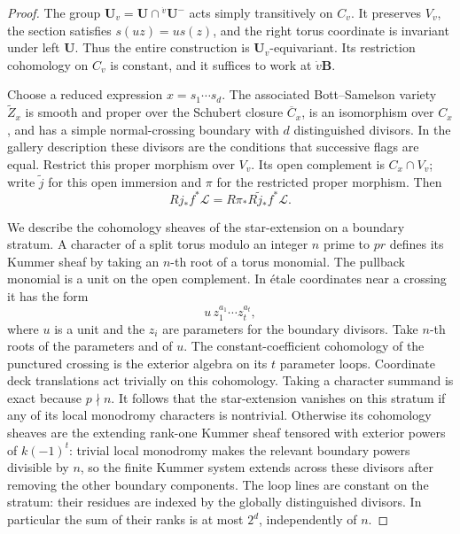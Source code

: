 \begin{proof}
The group \(\mathbf U_v=\mathbf U\cap{}^{\dot v}\mathbf U^-\) acts
simply transitively on \(C_v\). It preserves \(V_v\), the section
satisfies \(s(uz)=us(z)\), and the right torus coordinate is invariant
under left \(\mathbf U\). Thus the entire construction is
\(\mathbf U_v\)-equivariant. Its restriction cohomology on \(C_v\) is
constant, and it suffices to work at \(\dot v\mathbf B\).

Choose a reduced expression \(x=s_1\cdots s_d\). The associated
Bott--Samelson variety \(\widetilde Z_x\) is smooth and proper over
the Schubert closure \(\overline C_x\), is an isomorphism over \(C_x\),
and has a simple normal-crossing boundary with \(d\) distinguished
divisors. In the gallery description these divisors are the conditions
that successive flags are equal. Restrict this proper morphism over
\(V_v\). Its open complement is \(C_x\cap V_v\); write \(\widetilde j\)
for this open immersion and \(\pi\) for the restricted proper morphism.
Then
\[
 Rj_*f^*\mathcal L=R\pi_*R\widetilde j_*f^*\mathcal L.
\]

We describe the cohomology sheaves of the star-extension on a boundary
stratum. A character of a split torus modulo an integer \(n\) prime
to \(pr\) defines its Kummer sheaf by taking an \(n\)-th root of a
torus monomial. The pullback monomial is a unit on the open complement.
In \'etale coordinates near a crossing it has the form
\[
 u\,z_1^{a_1}\cdots z_t^{a_t},
\]
where \(u\) is a unit and the \(z_i\) are parameters for the boundary
divisors. Take \(n\)-th roots of the parameters and of \(u\).
The constant-coefficient cohomology of the punctured crossing is the
exterior algebra on its \(t\) parameter loops. Coordinate deck
translations act trivially on this cohomology. Taking a character
summand is exact because \(p\nmid n\). It follows that the
star-extension vanishes on this stratum if any of its local monodromy
characters is nontrivial. Otherwise its cohomology sheaves are the
extending rank-one Kummer sheaf tensored with exterior powers of
\(k(-1)^t\): trivial local monodromy makes the relevant boundary
powers divisible by \(n\), so the finite Kummer system extends across
these divisors after removing the other boundary components.
The loop lines are constant on the stratum: their residues
are indexed by the globally distinguished divisors. In particular the
sum of their ranks is at most \(2^d\), independently of \(n\).


\end{proof}
